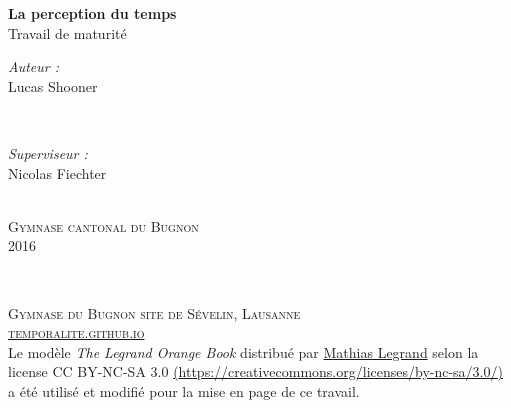 \documentclass[12pt,fleqn,oneside,french,openany]{book} %
\begin{document}

\begingroup
\thispagestyle{empty}
\centering
\vspace*{6,8cm}
\par\normalfont\fontsize{35}{35}\sffamily\selectfont

\textbf{La perception du temps}\\
{\LARGE Travail de maturité}\par %
\vspace*{0,8cm}
\begin{minipage}{0.46\textwidth}
	\begin{flushleft} \large
		\emph{Auteur :}\\
		{\Large Lucas Shooner} %
	\end{flushleft}
\end{minipage}
~
\begin{minipage}{0.46\textwidth}
	\begin{flushright} \large
		\emph{Superviseur :} \\
		{\Large Nicolas Fiechter} %
	\end{flushright}
\end{minipage} \\ 
{{\large \textsc{Gymnase cantonal du Bugnon}}} \\
{\large 2016}\\ \par
\endgroup


\newpage
~\vfill
\thispagestyle{empty}

\noindent \textsc{Gymnase du Bugnon site de Sévelin, Lausanne} \\

\noindent \textsc{\href{https://temporalite.github.io}{temporalite.github.io}} \\ 

\noindent Le modèle \emph{The Legrand Orange Book} distribué par \href{legrand.mathias@gmail.com}{Mathias Legrand} selon la license CC BY-NC-SA 3.0 \href{https://creativecommons.org/licenses/by-nc-sa/3.0/}{ (\url{https://creativecommons.org/licenses/by-nc-sa/3.0/})} a été utilisé et modifié pour la mise en page de ce travail. \\ 
\end{document}
